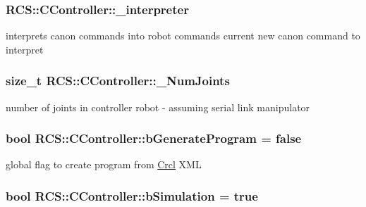 \hypertarget{structRCS_1_1CController_a4c3c287cebfd9fa9fb413205fa0b49f6}{
\subsubsection[{\-\_\-interpreter}]{ R\-C\-S\-::\-C\-Controller\-::\-\_\-interpreter}}\label{structRCS_1_1CController_a4c3c287cebfd9fa9fb413205fa0b49f6}
interprets canon commands into robot commands current new canon command to interpret \hypertarget{structRCS_1_1CController_a9b155c29a4fbb8b1a36dada1417126ff}{
\subsubsection[{\-\_\-\-Num\-Joints}]{\setlength{\rightskip}{0pt plus 5cm}size\-\_\-t R\-C\-S\-::\-C\-Controller\-::\-\_\-\-Num\-Joints\hspace{0.3cm}{\ttfamily [static]}}}\label{structRCS_1_1CController_a9b155c29a4fbb8b1a36dada1417126ff}
number of joints in controller robot -\/ assuming serial link manipulator \hypertarget{structRCS_1_1CController_a5b5e83348fbf18e362a59a2d96668466}{
\subsubsection[{b\-Generate\-Program}]{\setlength{\rightskip}{0pt plus 5cm}bool R\-C\-S\-::\-C\-Controller\-::b\-Generate\-Program = false\hspace{0.3cm}{\ttfamily [static]}}}\label{structRCS_1_1CController_a5b5e83348fbf18e362a59a2d96668466}
global flag to create program from \hyperlink{namespaceCrcl}{Crcl} X\-M\-L \hypertarget{structRCS_1_1CController_a5cc727cd1f880d16be6f34d501e06ef0}{
\subsubsection[{b\-Simulation}]{\setlength{\rightskip}{0pt plus 5cm}bool R\-C\-S\-::\-C\-Controller\-::b\-Simulation = true\hspace{0.3cm}{\ttfamily [static]}}}\label{structRCS_1_1CController_a5cc727cd1f880d16be6f34d501e06ef0}
